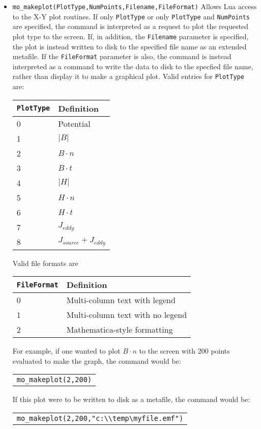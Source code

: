 \begin{itemize}
\item \verb+mo_makeplot(PlotType,NumPoints,Filename,FileFormat)+
Allows Lua access to the X-Y plot routines.  If only {\tt PlotType} or only {\tt PlotType}
and {\tt NumPoints} are specified, the command is interpreted as a request to plot the
requested plot type to the screen.  If, in addition, the {\tt Filename} parameter is specified,
the plot is instead written to disk to the specified file name as an extended metafile.
If the {\tt FileFormat} parameter is also, the command is instead interpreted as a command to
write the data to disk to the specfied file name, rather than display it to make a
graphical plot.
Valid entries for {\tt PlotType} are:
\begin{center}
\begin{tabular}{ll} \hline
{\tt PlotType} & Definition \\ \hline
0 & Potential \\
1 & $|B|$ \\
2 & $B \cdot n$ \\
3 & $B \cdot t$ \\
4 & $|H|$ \\
5 & $H \cdot n$ \\
6 & $H \cdot t$ \\
7 & $J_{eddy}$ \\
8 & $J_{source}+J_{eddy}$ \\
\hline
\end{tabular}
\end{center}
Valid file formats are
\begin{center}
\begin{tabular}{ll} \hline
{\tt FileFormat} & Definition \\ \hline
0 & Multi-column text with legend \\
1 & Multi-column text with no legend \\
2 & Mathematica-style formatting \\
\hline
\end{tabular}
\end{center}
For example, if one wanted to plot $B \cdot n$ to the screen with 200 points evaluated to
make the graph, the command would be:

\begin{tabular}{l} {\tt mo\_makeplot(2,200)} \end{tabular}

If this plot were to be written to disk as a metafile, the command would be:

\begin{tabular}{l} \verb+mo_makeplot(2,200,"c:\\temp\myfile.emf")+ \end{tabular}


\end{itemize}
